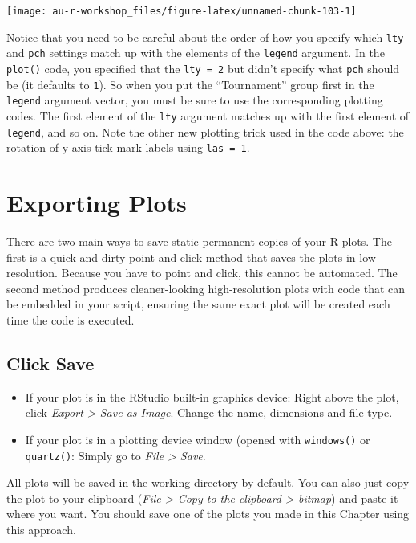 \documentclass[]{book}
\providecommand{\tightlist}{%
  \setlength{\itemsep}{0pt}\setlength{\parskip}{0pt}}
\begin{document}
\begin{center}\texttt{[image: au-r-workshop\_files/figure-latex/unnamed-chunk-103-1]} \end{center}

Notice that you need to be careful about the order of how you specify which \texttt{lty} and \texttt{pch} settings match up with the elements of the \texttt{legend} argument. In the \texttt{plot()} code, you specified that the \texttt{lty\ =\ 2} but didn't specify what \texttt{pch} should be (it defaults to \texttt{1}). So when you put the ``Tournament'' group first in the \texttt{legend} argument vector, you must be sure to use the corresponding plotting codes. The first element of the \texttt{lty} argument matches up with the first element of \texttt{legend}, and so on. Note the other new plotting trick used in the code above: the rotation of y-axis tick mark labels using \texttt{las\ =\ 1}.

\hypertarget{exporting-plots}{%
\section{Exporting Plots}\label{exporting-plots}}

There are two main ways to save static permanent copies of your R plots. The first is a quick-and-dirty point-and-click method that saves the plots in low-resolution. Because you have to point and click, this cannot be automated. The second method produces cleaner-looking high-resolution plots with code that can be embedded in your script, ensuring the same exact plot will be created each time the code is executed.

\hypertarget{click-save}{%
\subsection{Click Save}\label{click-save}}

\begin{itemize}
\tightlist
\item
  If your plot is in the RStudio built-in graphics device: Right above the plot, click \emph{Export \textgreater{} Save as Image}. Change the name, dimensions and file type.
\item
  If your plot is in a plotting device window (opened with \texttt{windows()} or \texttt{quartz()}: Simply go to \emph{File \textgreater{} Save}.
\end{itemize}

All plots will be saved in the working directory by default. You can also just copy the plot to your clipboard (\emph{File \textgreater{} Copy to the clipboard \textgreater{} bitmap}) and paste it where you want. You should save one of the plots you made in this Chapter using this approach.
\end{document}
